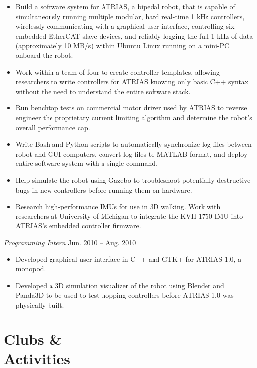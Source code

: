 \documentclass[10pt,letterpaper,margin]{res}
\begin{document}
\begin{resume}
\begin{itemize}
	\item Build a software system for ATRIAS, a bipedal robot, that is capable
		of simultaneously running multiple modular, hard real-time 1 kHz
		controllers, wirelessly communicating with a graphical user interface,
		controlling six embedded EtherCAT slave devices, and reliably logging
		the full 1 kHz of data (approximately 10 MB/s) within Ubuntu Linux
		running on a mini-PC onboard the robot.
	\item Work within a team of four to create controller templates, allowing
		researchers to write controllers for ATRIAS knowing only basic C++
		syntax without the need to understand the entire software stack.
	\item Run benchtop tests on commercial motor driver used by ATRIAS to
		reverse engineer the proprietary current limiting algorithm and
		determine the robot's overall performance cap.
	\item Write Bash and Python scripts to automatically synchronize log files
		between robot and GUI computers, convert log files to MATLAB format,
		and deploy entire software system with a single command.
	\item Help simulate the robot using Gazebo to troubleshoot potentially
		destructive bugs in new controllers before running them on hardware.
	\item Research high-performance IMUs for use in 3D walking. Work with
		researchers at University of Michigan to integrate the KVH 1750 IMU
		into ATRIAS's embedded controller firmware.
\end{itemize}

{\it Programming Intern} \hfill {\color{lightgray} Jun. 2010 -- Aug. 2010}\vspace{0.2em}

\begin{itemize}
	\item Developed graphical user interface in C++ and GTK+ for ATRIAS 1.0,
		a monopod.
	\item Developed a 3D simulation visualizer of the robot using Blender and
		Panda3D to be used to test hopping controllers before ATRIAS 1.0 was
		physically built.
\end{itemize}



\section{Clubs \& \\ Activities}


\end{resume}
\end{document}
